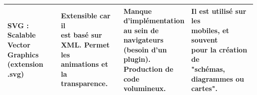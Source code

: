 \begin{table}[H]
\begin{tabular}{|l|l|l|l|}
		\makecell{SVG : Scalable\\
			Vector\\
			Graphics\\
			(extension\\
			.svg)}
		& \makecell{Extensible car il\\
			est basé sur\\
			XML. Permet les\\
			animations et la\\
			transparence.} 
		& \makecell{Manque\\
			d'implémentation\\
			au sein de\\
			navigateurs\\
			(besoin d'un\\
			plugin).\\
			Production de\\
			code\\
			volumineux.}
		&  \makecell{Il est utilisé sur les\\
			mobiles, et souvent\\
			pour la création de\\
			"schémas,\\
			diagrammes ou\\
			cartes".}   \\
		\hline
%		
%		

\end{tabular}
\end{table}
